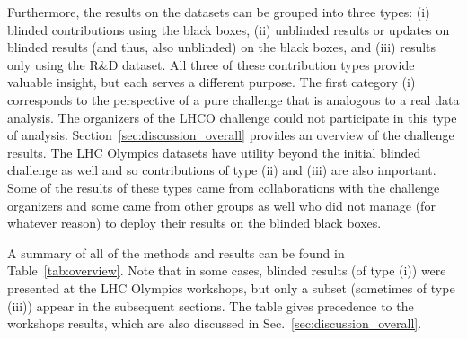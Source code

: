 \documentclass[a4paper,11pt]{article}
\begin{document}
Furthermore, the results on the datasets can be grouped into three types: (i) blinded contributions using the black boxes, (ii) unblinded results or updates on blinded results (and thus, also unblinded) on the black boxes, and (iii) results only using the R\&D dataset.  All three of these contribution types provide valuable insight, but each serves a different purpose.  The first category (i) corresponds to the perspective of a pure challenge that is analogous to a real data analysis.  The organizers of the LHCO challenge could not participate in this type of analysis.  Section~\ref{sec:discussion_overall} provides an overview of the challenge results.  The LHC Olympics datasets have utility beyond the initial blinded challenge as well and so contributions of type (ii) and (iii) are also important.  Some of the results of these types came from collaborations with the challenge organizers and some came from other groups as well who did not manage (for whatever reason) to deploy their results on the blinded black boxes. 

A summary of all of the methods and results can be found in Table~\ref{tab:overview}. Note that in some cases, blinded results (of type (i)) were presented at the LHC Olympics workshops, but only a subset (sometimes of type (iii)) appear in the subsequent sections.  The table gives precedence to the workshops results, which are also discussed in Sec.~\ref{sec:discussion_overall}. 
\end{document}
